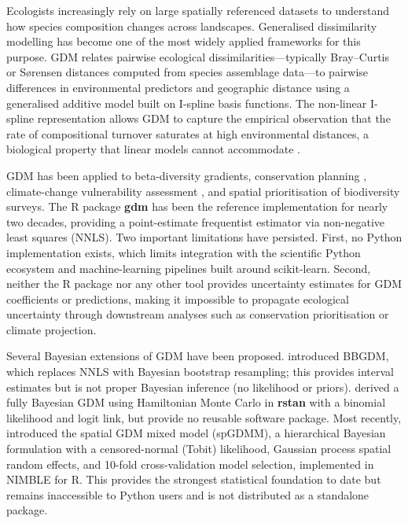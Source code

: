 \documentclass[12pt,a4paper]{article}
\begin{document}
Ecologists increasingly rely on large spatially referenced datasets to
understand how species composition changes across landscapes. Generalised
dissimilarity modelling \citep[GDM;][]{ferrier2007} has become one of the most
widely applied frameworks for this purpose. GDM relates pairwise ecological
dissimilarities---typically Bray--Curtis or S{\o}rensen distances computed from
species assemblage data---to pairwise differences in environmental predictors
and geographic distance using a generalised additive model built on I-spline
basis functions. The non-linear I-spline representation allows GDM to capture
the empirical observation that the rate of compositional turnover saturates at
high environmental distances, a biological property that linear models cannot
accommodate \citep{ferrier2007,mokany2022}.

GDM has been applied to beta-diversity gradients, conservation planning
\citep{mokany2022}, climate-change vulnerability assessment
\citep{fitzpatrick2013}, and spatial prioritisation of biodiversity surveys.
The R package \textbf{gdm} \citep{fitzpatrick2021} has been the reference
implementation for nearly two decades, providing a point-estimate frequentist
estimator via non-negative least squares (NNLS). Two important limitations
have persisted. First, no Python implementation exists, which limits
integration with the scientific Python ecosystem and machine-learning pipelines
built around scikit-learn. Second, neither the R package nor any other tool
provides uncertainty estimates for GDM coefficients or predictions, making it
impossible to propagate ecological uncertainty through downstream analyses such
as conservation prioritisation or climate projection.

Several Bayesian extensions of GDM have been proposed. \citet{woolley2017}
introduced BBGDM, which replaces NNLS with Bayesian bootstrap resampling; this
provides interval estimates but is not proper Bayesian inference (no likelihood
or priors). \citet{lusiana2023} derived a fully Bayesian GDM using Hamiltonian
Monte Carlo in \textbf{rstan} with a binomial likelihood and logit link, but
provide no reusable software package. Most recently, \citet{white2024}
introduced the spatial GDM mixed model (spGDMM), a hierarchical Bayesian
formulation with a censored-normal (Tobit) likelihood, Gaussian process spatial
random effects, and 10-fold cross-validation model selection, implemented in
NIMBLE for R\@. This provides the strongest statistical foundation to date but
remains inaccessible to Python users and is not distributed as a standalone
package.
\end{document}
